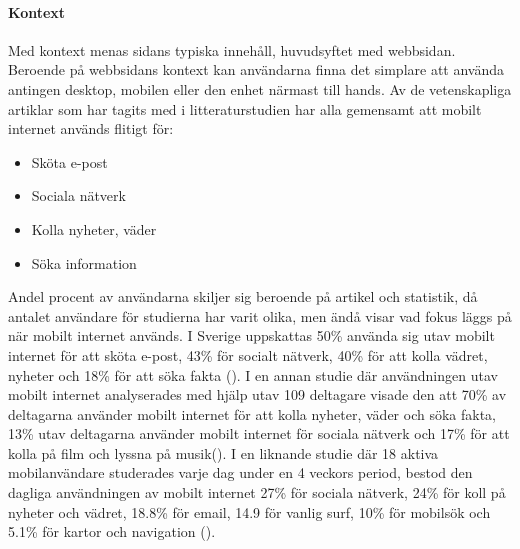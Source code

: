 \documentclass[11pt]{article}
\begin{document}
\paragraph{Kontext}\mbox{}

Med kontext menas sidans typiska innehåll, huvudsyftet med webbsidan. Beroende på webbsidans kontext kan användarna finna det simplare att använda antingen desktop, mobilen eller den enhet närmast till hands. Av de vetenskapliga artiklar som har tagits med i litteraturstudien har alla gemensamt att mobilt internet används flitigt för:

\begin{itemize}
	\item{Sköta e-post}
	\item{Sociala nätverk}
	\item{Kolla nyheter, väder}
	\item{Söka information}
\end{itemize}
\bigskip
Andel procent av användarna skiljer sig beroende på artikel och statistik, då antalet användare för studierna har varit olika, men ändå visar vad fokus läggs på när mobilt internet används. I Sverige uppskattas  50\% använda sig utav mobilt internet för att sköta e-post, 43\% för socialt nätverk, 40\% för att kolla vädret, nyheter och 18\% för att söka fakta (\cite[s. 25]{.se}). I en annan studie där användningen utav mobilt internet analyserades med hjälp utav 109 deltagare visade den att 70\% av deltagarna använder mobilt internet för att kolla nyheter, väder och söka fakta, 13\% utav deltagarna använder mobilt internet för sociala nätverk och 17\% för att kolla på film och lyssna på musik(\cite{usageusability2}). I en liknande studie där 18 aktiva mobilanvändare studerades varje dag under en 4 veckors period, bestod den dagliga användningen av mobilt internet 27\% för sociala nätverk, 24\% för koll på nyheter och vädret, 18.8\% för email, 14.9 för vanlig surf, 10\% för mobilsök och 5.1\% för kartor och navigation (\cite{mobilewebsearch}).
\end{document}
